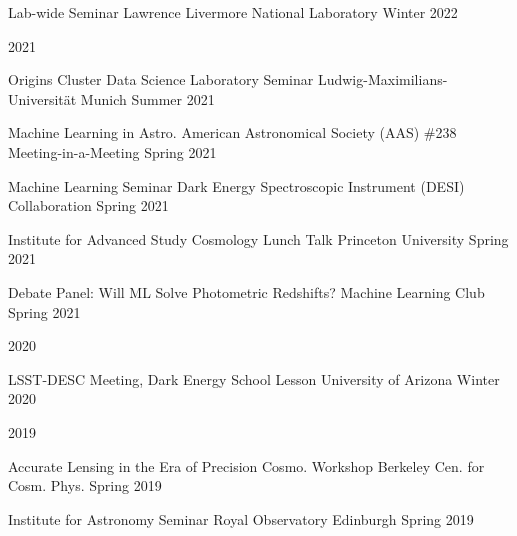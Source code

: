 \documentclass[11pt,letterpaper]{article}
\begin{document}
\begin{list}{}{\malzlist}
\begin{list}{}{\malzlist}
		{Lab-wide Seminar}
		{Lawrence Livermore National Laboratory}
		{Winter 2022}
	\end{list}
		\item 2021
		\nopagebreak\begin{list}{}{\malzlist}
			\item {}
			{Origins Cluster Data Science Laboratory Seminar}
			{Ludwig-Maximilians-Universit{\"a}t Munich}%
		{Summer 2021}
		\item {}
		{Machine Learning in Astro.}%
	{American Astronomical Society (AAS) \#238 Meeting-in-a-Meeting}
	{Spring 2021}
	\item {}
	{Machine Learning Seminar}
	{Dark Energy Spectroscopic Instrument (DESI) Collaboration}
	{Spring 2021}
	\item {}
	{Institute for Advanced Study Cosmology Lunch Talk}
	{Princeton University}
	{Spring 2021}
	\item {}
	{Debate Panel: Will ML Solve Photometric Redshifts?}
	{Machine Learning Club}
	{Spring 2021}
\end{list}
\item 2020
\nopagebreak\begin{list}{}{\malzlist}
	\item {}
	{LSST-DESC Meeting, Dark Energy School Lesson}
	{University of Arizona}
	{Winter 2020}
\end{list}
\item 2019
\nopagebreak\begin{list}{}{\malzlist}
	\item {}
	{Accurate Lensing in the Era of Precision Cosmo. Workshop}
	{Berkeley Cen. for Cosm. Phys.}
	{Spring 2019}
	\item {}
	{Institute for Astronomy Seminar}
	{Royal Observatory Edinburgh}
	{Spring 2019}
	\item {}

\end{list}
\end{list}
\end{document}
